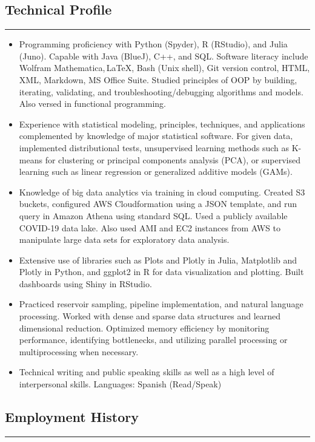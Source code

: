 \documentclass[letterpaper, 10 pt]{article}
\begin{document}
\subsection*{Technical Profile}
\noindent\rule[0.75ex]{\linewidth}{0.55 pt}
\begin{itemize}
\setlength\itemsep{0.10 em}
\item Programming proficiency with Python (Spyder), R (RStudio), and Julia (Juno). Capable with Java (BlueJ), C++, and SQL. Software literacy include Wolfram Mathematica,\,\LaTeX, Bash (Unix shell), Git version control, HTML, XML, Markdown, MS Office Suite. Studied principles of OOP by building, iterating, validating, and troubleshooting/debugging algorithms and models. Also versed in functional programming.
\item Experience with statistical modeling, principles, techniques, and applications complemented by knowledge of major statistical software. For given data, implemented distributional tests, unsupervised learning methods such as K-means for clustering or principal components analysis (PCA), or supervised learning such as linear regression or generalized additive models (GAMs).
\item Knowledge of big data analytics via training in cloud computing. Created S3 buckets, configured AWS Cloudformation using a JSON template, and run query in Amazon Athena using standard SQL. Used a publicly available COVID-19 data lake. Also used AMI and EC2 instances from AWS to manipulate large data sets for exploratory data analysis.
\item Extensive use of libraries such as Plots and Plotly in Julia, Matplotlib and Plotly in Python, and ggplot2 in R for data visualization and plotting. Built dashboards using Shiny in RStudio.
\item Practiced reservoir sampling, pipeline implementation, and natural language processing. Worked with dense and sparse data structures and learned dimensional reduction. Optimized memory efficiency by monitoring performance, identifying bottlenecks, and utilizing parallel processing or multiprocessing when necessary.
\item Technical writing and public speaking skills as well as a high level of interpersonal skills. Languages: Spanish (Read/Speak)
\end{itemize}

\subsection*{Employment History}
\noindent\rule[0.75ex]{\linewidth}{0.55 pt}
\end{document}
